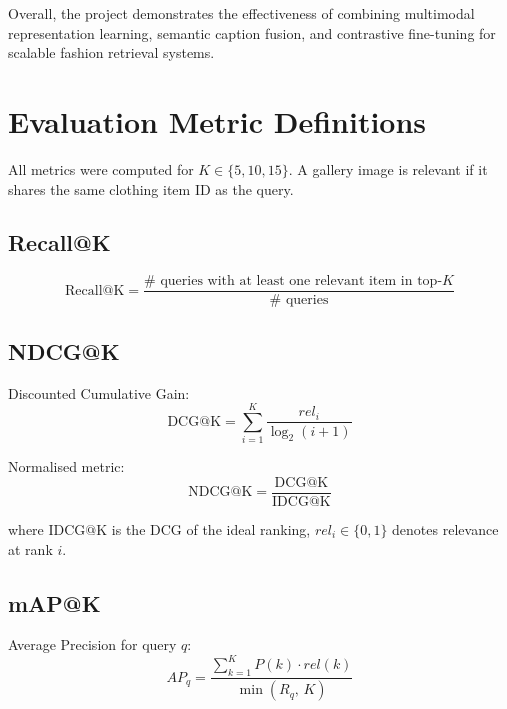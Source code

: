 \documentclass[11pt,a4paper]{article}
\begin{document}
Overall, the project demonstrates the effectiveness of combining multimodal representation learning, semantic caption fusion, and contrastive fine-tuning for scalable fashion retrieval systems.



\appendix

\section{Evaluation Metric Definitions}
\label{app:metrics}

All metrics were computed for $K \in \{5, 10, 15\}$. A gallery image is relevant if it shares the same clothing item ID as the query.

\subsection*{Recall@K}

\begin{equation}
\mathrm{Recall@K} =
\frac{\#\text{ queries with at least one relevant item in top-}K}{\#\text{ queries}}
\end{equation}

\subsection*{NDCG@K}

Discounted Cumulative Gain:
\begin{equation}
\mathrm{DCG@K} = \sum_{i=1}^{K} \frac{rel_i}{\log_2(i+1)}
\end{equation}

Normalised metric:
\begin{equation}
\mathrm{NDCG@K} = \frac{\mathrm{DCG@K}}{\mathrm{IDCG@K}}
\end{equation}

where $\mathrm{IDCG@K}$ is the DCG of the ideal ranking, $rel_i \in \{0,1\}$ denotes relevance at rank $i$.

\subsection*{mAP@K}

Average Precision for query $q$:
\begin{equation}
AP_q = \frac{\displaystyle\sum_{k=1}^{K} P(k)\cdot rel(k)}{\min(R_q,\, K)}
\end{equation}
\end{document}
